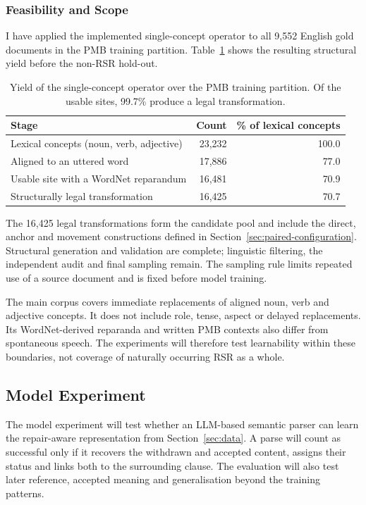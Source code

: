 \subsubsection{Feasibility and Scope}

I have applied the implemented single-concept operator to all 9,552 English
gold documents in the PMB training partition. Table~\ref{tab:coverage-funnel}
shows the resulting structural yield before the non-RSR hold-out.

\begin{table}[ht]
\centering
\small
\begin{tabular}{@{}lrr@{}}
\toprule
Stage & Count & \% of lexical concepts \\
\midrule
Lexical concepts (noun, verb, adjective) & 23,232 & 100.0 \\
Aligned to an uttered word               & 17,886 & 77.0 \\
Usable site with a WordNet reparandum    & 16,481 & 70.9 \\
Structurally legal transformation        & 16,425 & 70.7 \\
\bottomrule
\end{tabular}
\caption{Yield of the single-concept operator over the PMB training
partition. Of the usable sites, 99.7\% produce a legal transformation.}
\label{tab:coverage-funnel}
\end{table}

The 16,425 legal transformations form the candidate pool and include the
direct, anchor and movement constructions defined in
Section~\ref{sec:paired-configuration}. Structural generation and validation are complete;
linguistic filtering, the independent audit and final sampling remain. The
sampling rule limits repeated use of a source document and is fixed before
model training.

The main corpus covers immediate replacements of aligned noun, verb and
adjective concepts. It does not include role, tense, aspect or delayed
replacements. Its WordNet-derived reparanda and written PMB contexts also
differ from spontaneous speech. The experiments will therefore test learnability
within these boundaries, not coverage of naturally occurring RSR as a whole.


\subsection{Model Experiment}
\label{sec:model}

The model experiment will test whether an LLM-based semantic parser can learn
the repair-aware representation from Section~\ref{sec:data}. A parse will count
as successful only if it recovers the withdrawn and accepted content, assigns
their status and links both to the surrounding clause. The evaluation will
also test later reference, accepted meaning and generalisation beyond the
training patterns.

